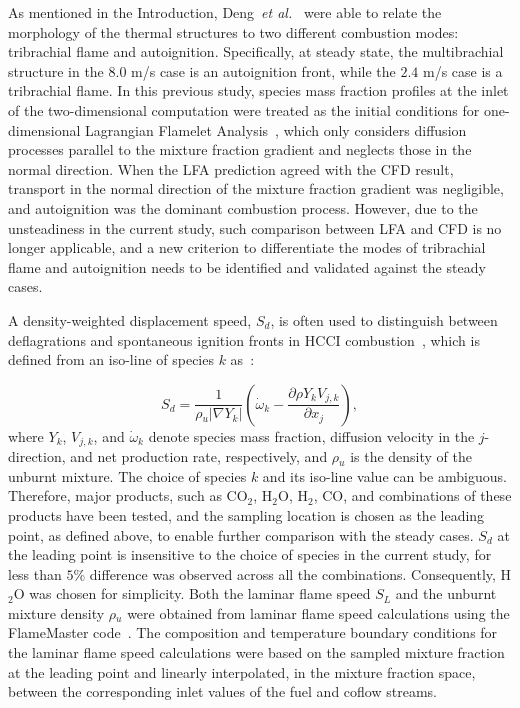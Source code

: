 \documentclass[review,3p,times]{elsarticle}
\def\pp#1#2{\frac{\partial #1}{\partial #2}}
\begin{document}
As mentioned in the Introduction, Deng~\emph {et al.}~\cite{deng15b} were able to relate the morphology of the thermal structures to two different combustion modes: tribrachial flame and autoignition.  Specifically, at steady state, the multibrachial structure in the $8.0$ m/s case is an autoignition front, while the $2.4$ m/s case is a tribrachial flame.  In this previous study, species mass fraction profiles at the inlet of the two-dimensional computation were treated as the initial conditions for one-dimensional Lagrangian Flamelet Analysis~\cite{pitsch98a}, which only considers diffusion processes parallel to the mixture fraction gradient and neglects those in the normal direction.  When the LFA prediction agreed with the CFD result, transport in the normal direction of the mixture fraction gradient was negligible, and autoignition was the dominant combustion process.  However, due to the unsteadiness in the current study, such comparison between LFA and CFD is no longer applicable, and a new criterion to differentiate the modes of tribrachial flame and autoignition needs to be identified and validated against the steady cases.

A density-weighted displacement speed, $S_d$, is often used to distinguish between deflagrations and spontaneous ignition fronts in HCCI combustion~\cite{yoo13}, which is defined from an iso-line of species $k$ as~\cite{ruetsch95,im99}:

\begin{equation} \label{eq:sd}
S_d = \frac{1}{\rho{_u} |\nabla Y_k|} \left(\dot{\omega}{_k} - \pp{\rho Y_k V_{j,k}}{x_j} \right),
\end{equation}
where $Y_k$, $V_{j,k}$, and $\dot{\omega}{_k}$ denote species mass fraction, diffusion velocity in the $j$-direction, and net production rate, respectively, and $\rho {_u}$ is the density of the unburnt mixture.  The choice of species $k$ and its iso-line value can be ambiguous.  Therefore, major products, such as CO$_2$, H$_2$O, H$_2$, CO, and combinations of these products have been tested, and the sampling location is chosen as the leading point, as defined above, to enable further comparison with the steady cases.  $S_d$ at the leading point is insensitive to the choice of species in the current study, for less than $5$\% difference was observed across all the combinations.  Consequently, H$_2$O was chosen for simplicity.  Both the laminar flame speed $S_L$ and the unburnt mixture density $\rho {_u}$ were obtained from laminar flame speed calculations using the FlameMaster code~\cite{flamemaster}.  The composition and temperature boundary conditions for the laminar flame speed calculations were based on the sampled mixture fraction at the leading point and linearly interpolated, in the mixture fraction space, between the corresponding inlet values of the fuel and coflow streams.  
\end{document}
